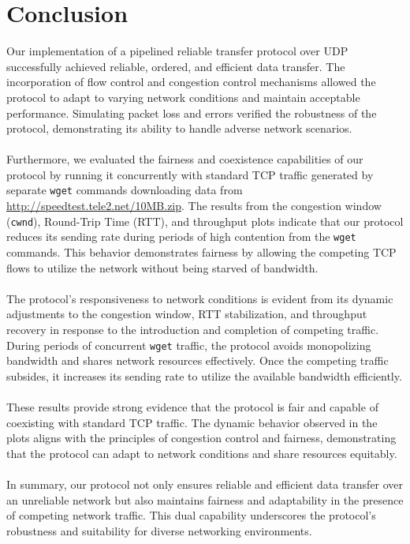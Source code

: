 \documentclass[11pt]{article}
\begin{document}
\section{Conclusion}

Our implementation of a pipelined reliable transfer protocol over UDP successfully achieved reliable, ordered, and efficient data transfer. The incorporation of flow control and congestion control mechanisms allowed the protocol to adapt to varying network conditions and maintain acceptable performance. Simulating packet loss and errors verified the robustness of the protocol, demonstrating its ability to handle adverse network scenarios.\\\\
Furthermore, we evaluated the fairness and coexistence capabilities of our protocol by running it concurrently with standard TCP traffic generated by separate \texttt{wget} commands downloading data from \url{http://speedtest.tele2.net/10MB.zip}. The results from the congestion window (\texttt{cwnd}), Round-Trip Time (RTT), and throughput plots indicate that our protocol reduces its sending rate during periods of high contention from the \texttt{wget} commands. This behavior demonstrates fairness by allowing the competing TCP flows to utilize the network without being starved of bandwidth.\\\\
The protocol's responsiveness to network conditions is evident from its dynamic adjustments to the congestion window, RTT stabilization, and throughput recovery in response to the introduction and completion of competing traffic. During periods of concurrent \texttt{wget} traffic, the protocol avoids monopolizing bandwidth and shares network resources effectively. Once the competing traffic subsides, it increases its sending rate to utilize the available bandwidth efficiently.\\\\
These results provide strong evidence that the protocol is fair and capable of coexisting with standard TCP traffic. The dynamic behavior observed in the plots aligns with the principles of congestion control and fairness, demonstrating that the protocol can adapt to network conditions and share resources equitably.\\\\
In summary, our protocol not only ensures reliable and efficient data transfer over an unreliable network but also maintains fairness and adaptability in the presence of competing network traffic. This dual capability underscores the protocol's robustness and suitability for diverse networking environments.
\end{document}
